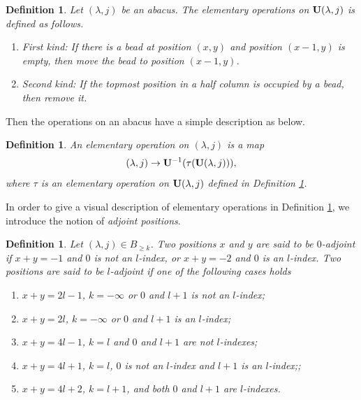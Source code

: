 \documentclass[11pt]{amsart}
\theoremstyle{plain}
\numberwithin{equation}{subsection}
\newtheorem{definition}[theorem]{Definition}
\newcommand{\lam}{\lambda}
\begin{document}
\begin{definition}\label{2.17}
Let $(\lam, j)$ be an abacus. The elementary operations on ${\rm \bf U}(\lam, j)$ is defined as follows.
\begin{enumerate}
  \item [\rm(1)] First kind: If there is a bead at position $(x, y)$ and position $(x-1, y)$ is empty,
then move the bead to position $(x-1, y)$.
  \item [\rm(2)] Second kind: If the topmost position in a half column is occupied by a bead, then remove it.
\end{enumerate}
\end{definition}

Then the operations on an abacus have a simple description as below.

\begin{definition}\label{2.18}
An elementary operation on $(\lam, j)$ is a map $$(\lam, j)\rightarrow{\rm\bf U}^{-1}{(\tau(\rm\bf U}(\lam, j))),$$ 
where $\tau$ is an elementary operation on ${\rm \bf U}(\lam, j)$ defined in Definition \ref{2.17}.
\end{definition}

In order to give a visual description of elementary operations in Definition \ref{2.18}, we introduce the notion of {\em adjoint positions}.

\begin{definition}\label{2.19}
Let $(\lam, j)\in B_{\geq k}$. Two positions $x$ and $y$ are said to be $0$-adjoint 
if $x+y=-1$ and $0$ is not an $l$-index, or $x+y=-2$ and $0$ is an $l$-index.
Two positions are said to be $l$-adjoint if one of the following cases holds
\begin{enumerate}
\item [\rm (1)] $x+y=2l-1$, $k=-\infty$ or $0$ and $l+1$ is not an $l$-index;
\item [\rm (2)] $x+y=2l$, $k=-\infty$ or $0$ and $l+1$ is an $l$-index;
\item [\rm (3)] $x+y=4l-1$, $k=l$ and $0$ and $l+1$ are not $l$-indexes;
\item [\rm (4)] $x+y=4l+1$, $k=l$, $0$ is not an $l$-index and $l+1$ is an $l$-index;;
\item [\rm (5)] $x+y=4l+2$, $k=l+1$, and both $0$ and $l+1$ are $l$-indexes.
\end{enumerate}
\end{definition}
\end{document}
